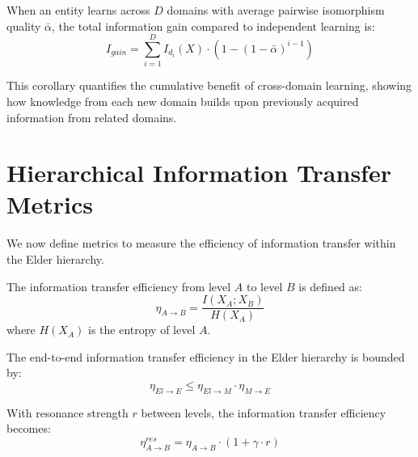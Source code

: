 \begin{corollary}
When an entity learns across $D$ domains with average pairwise isomorphism quality $\bar{\alpha}$, the total information gain compared to independent learning is:
\begin{equation}
I_{gain} = \sum_{i=1}^{D} I_{d_i}(X) \cdot (1 - (1 - \bar{\alpha})^{i-1})
\end{equation}
\end{corollary}

This corollary quantifies the cumulative benefit of cross-domain learning, showing how knowledge from each new domain builds upon previously acquired information from related domains.

\section{Hierarchical Information Transfer Metrics}



We now define metrics to measure the efficiency of information transfer within the Elder hierarchy.

\begin{definition}
The information transfer efficiency from level $A$ to level $B$ is defined as:
\begin{equation}
\eta_{A \to B} = \frac{I(X_A; X_B)}{H(X_A)}
\end{equation}
where $H(X_A)$ is the entropy of level $A$.
\end{definition}

\begin{theorem}
The end-to-end information transfer efficiency in the Elder hierarchy is bounded by:
\begin{equation}
\eta_{El \to E} \leq \eta_{El \to M} \cdot \eta_{M \to E}
\end{equation}
\end{theorem}

\begin{theorem}
With resonance strength $r$ between levels, the information transfer efficiency becomes:
\begin{equation}
\eta_{A \to B}^{res} = \eta_{A \to B} \cdot (1 + \gamma \cdot r)
\end{equation}
\end{theorem}

